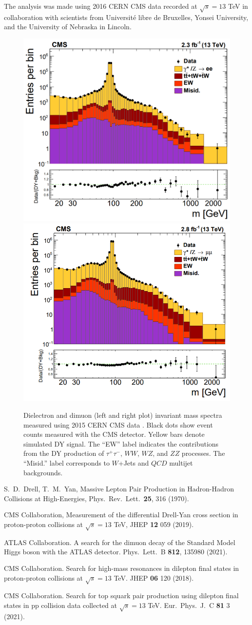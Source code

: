 \documentclass[a4paper,10pt,english]{article}
\begin{document}
The analysis was made using 2016 CERN CMS data recorded at $\sqrt{s}=13$ TeV in collaboration with scientists
from Universit\'{e} libre de Bruxelles, Yonsei University, and the University of Nebraska in Lincoln.
 
\vspace{-0.3cm}
\begin{figure}[H]
	\includegraphics[width=.45\linewidth]{Figure1.png}
	\includegraphics[width=.45\linewidth]{Figure2.png}
\vspace{-0.2cm}
\caption{Dielectron and dimuon (left and right plot) invariant mass spectra measured using 2015 CERN CMS data \cite{DY13}.
      Black dots show event counts measured with the CMS detector.    
      Yellow bars denote simulated DY signal.
      The ``EW'' label indicates the contributions from the DY production of $\tau^+\tau^-$, $WW$, $WZ$, and $ZZ$ processes.
      The ``Misid.'' label corresponds to $W$+Jets and $QC\!D$ multijet backgrounds.}
\end{figure}

\vspace{-0.5cm}
\begin{thebibliography}{References}
S.\ D.\ Drell, T.\ M.\ Yan, Massive Lepton Pair Production in Hadron-Hadron Collisions at High-Energies,
Phys.\ Rev.\ Lett.\ \textbf{25}, 316 (1970).

CMS Collaboration, Measurement of the differential Drell-Yan cross section in proton-proton collisions
at $\sqrt{s}=13$ TeV, JHEP \textbf{12} 059 (2019).

ATLAS Collaboration. A search for the dimuon decay of the Standard Model Higgs boson with the ATLAS detector.
Phys.\ Lett.\ B \textbf{812}, 135980 (2021).

CMS Collaboration. Search for high-mass resonances in dilepton final states in proton-proton collisions
at $\sqrt{s}=13$ TeV. JHEP \textbf{06} 120 (2018).

CMS Collaboration. Search for top squark pair production using dilepton final states in pp collision data
collected at $\sqrt{s}=13$ TeV. Eur.\ Phys.\ J.\ C \textbf{81} 3 (2021).
\end{thebibliography}
\end{document}
